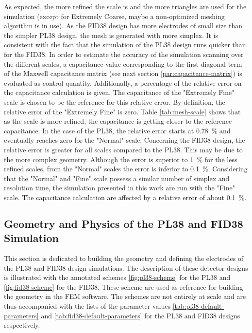 As expected, the more refined the scale is and the more triangles are used for the simulation (except for Extremely Coarse, maybe a non-optimized meshing algorithm is in use). As the FID38 design has more electrodes of small size than the simpler PL38 design, the mesh is generated with more simplex. It is consistent with the fact that the simulation of the PL38 design runs quicker than for the FID38.
In order to estimate the accuracy of the simulation scanning over the different scales, a capacitance value corresponding to the first diagonal term of the Maxwell capacitance matrix (see next section \ref{par:capacitance-matrix}) is evaluated as control quantity. Additionally, a percentage of the relative error on the capacitance calculation is given. The capacitance of the "Extremely Fine" scale is chosen to be the reference for this relative error. By definition, the relative error of the "Extremely Fine" is zero. Table \ref{tab:mesh-scale} shows that as the scale is more refined, the capacitance is getting closer to the reference capacitance.
In the case of the PL38, the relative error starts at \SI{0.78}{\percent} and eventually reaches zero for the "Normal" scale. Concerning the FID38 design, the relative error is greater for all scales compared to the PL38. This may be due to the more complex geometry. Although the error is superior to \SI{1}{\percent} for the less refined scales, from the "Normal" scales the error is inferior to \SI{0.1}{\percent}.
Considering that the "Normal" and "Fine" scale possess a similar number of simplex and resolution time, the simulation presented in this work are run with the "Fine" scale. The capacitance calculation are affected by a relative error of about \SI{0.1}{\percent}. 


\subsection{Geometry and Physics of the PL38 and FID38 Simulation}

This section is dedicated to building the geometry and defining the electrodes of the PL38 and FID38 design simulations. The description of these detector designs is illustrated with the annotated schemes \ref{fig:pl38-scheme} for the PL38 and \ref{fig:fid38-scheme} for the FID38. These scheme are used as reference for building the geometry in the FEM software. The schemes are not entirely at scale and are thus accompanied with the lists of the parameter values \ref{tab:pl38-default-parameters} and \ref{tab:fid38-default-parameters} for the PL38 and FID38 designs respectively.

